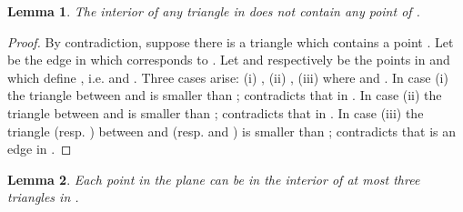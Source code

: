\documentclass[11pt,a4paper]{article}
\newtheorem{lemma}{Lemma}
\begin{document}
\begin{lemma}
 \label{empty-triangle-lemma}
The interior of any triangle in  does not contain any point of .
\end{lemma}
\begin{proof}
  By contradiction, suppose there is a triangle  which contains a point . Let  be the edge in  which corresponds to . Let  and  respectively be the points in  and  which define , i.e.  and . Three cases arise: (i) , (ii) , (iii)  where  and . In case (i) the triangle  between  and  is smaller than ; contradicts that  in .  In case (ii) the triangle  between  and  is smaller than ; contradicts that  in . In case (iii) the triangle  (resp. ) between  and  (resp.  and ) is smaller than ; contradicts that  is an edge in . 
\end{proof}

\begin{lemma}
 \label{intersection-lemma}
Each point in the plane can be in the interior of at most three triangles in . 
\end{lemma}
\end{document}
